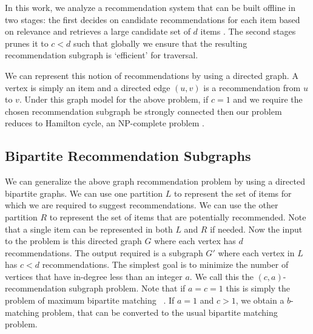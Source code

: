 
In this work, we analyze a recommendation system that can be built
offline in two stages: the first decides on candidate recommendations
for each item based on relevance and retrieves a large candidate set
of $d$ items \cite{Schafer1999, Adomavicius2005, Resnick1997}. The
second stages prunes it to $c < d$ such that globally we ensure that
the resulting recommendation subgraph is `efficient' for traversal. 


We can represent this notion of recommendations by using a directed graph. A
vertex is simply an item and a directed edge $(u, v)$ is a recommendation from
$u$ to $v$. Under this graph model for the above problem, if $c=1$ and we
require the chosen recommendation subgraph be strongly connected then our
problem reduces to Hamilton cycle, an NP-complete problem \cite{CLRS2001}. \vs

\subsection{Bipartite Recommendation Subgraphs}

We can generalize the above graph recommendation problem by using a
directed bipartite graphs. We can use one partition $L$ to represent
the set of items for which we are required to suggest
recommendations. We can use the other partition $R$ to represent the
set of items that are potentially recommended. Note that a single item
can be represented in both $L$ and $R$ if needed.  Now the input to
the problem is this directed graph $G$ where each vertex has $d$
recommendations. The output required is a subgraph $G'$ where each
vertex in $L$ has $c < d$ recommendations. The simplest goal is to
minimize the number of vertices that have in-degree less than an
integer $a$. We call this the $(c, a)$-recommendation subgraph
problem.  Note that if $a=c=1$ this is simply the problem of maximum
bipartite matching ~\cite{LovaszPlummer1986}. If $a=1$ and $c > 1$,
we obtain a $b$-matching problem, that can be converted to the
usual bipartite matching problem. \cite{Gabow1983}

